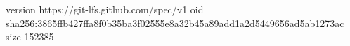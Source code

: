 version https://git-lfs.github.com/spec/v1
oid sha256:3865ffb427ffa8f0b35ba3f02555e8a32b45a89add1a2d5449656ad5ab1273ac
size 152385

